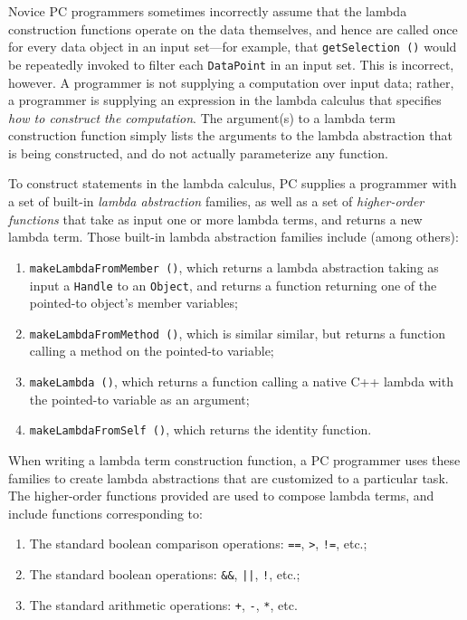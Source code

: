 Novice PC programmers sometimes incorrectly assume that the lambda construction functions operate on the data themselves, and
hence are called once for every data object in an input set---for example, 
that
\texttt{getSelection ()} would be repeatedly invoked to filter each \texttt{DataPoint} in an input set.  
This is incorrect, however.
A programmer is not supplying a computation over input data; rather, a programmer is supplying an expression in the lambda calculus that 
specifies \emph{how to construct the computation}.
The argument(s) to a lambda term construction function simply
lists the arguments to the lambda abstraction that is being constructed, and do not actually parameterize any function.

To construct statements in the lambda calculus, PC supplies a programmer with a set of built-in \emph{lambda abstraction} families, as 
well as a set of \emph{higher-order functions}
that take as input one or more lambda terms, and returns a new lambda term.  Those built-in lambda abstraction families 
include (among others):

\begin{enumerate}

\item \texttt{makeLambdaFromMember ()}, which returns 
a lambda abstraction taking as input a \texttt{Handle} to an \texttt{Object}, and returns a function returning one of the pointed-to object's member variables;

\item 
\texttt{makeLambdaFromMethod ()}, which is similar similar, but returns a function calling a method on the pointed-to variable;

\item \texttt{makeLambda ()}, which returns a function calling
a native C++ lambda with the pointed-to variable as an argument;

\item \texttt{makeLambdaFromSelf ()}, which returns the identity function.

\end{enumerate}

\noindent
When writing a lambda term construction function, a PC programmer uses these families to create lambda abstractions that
are customized to a particular task.
The higher-order functions provided are used to compose lambda terms, and
include functions corresponding to:

\begin{enumerate}
\item
The standard boolean comparison operations: \texttt{==}, \texttt{>}, \texttt{!=}, etc.;

\item
The standard boolean
operations: \texttt{\&\&}, \texttt{||}, \texttt{!}, etc.;

\item
The standard arithmetic operations: \texttt{+}, \texttt{-}, \texttt{*}, etc.  
\end{enumerate}


